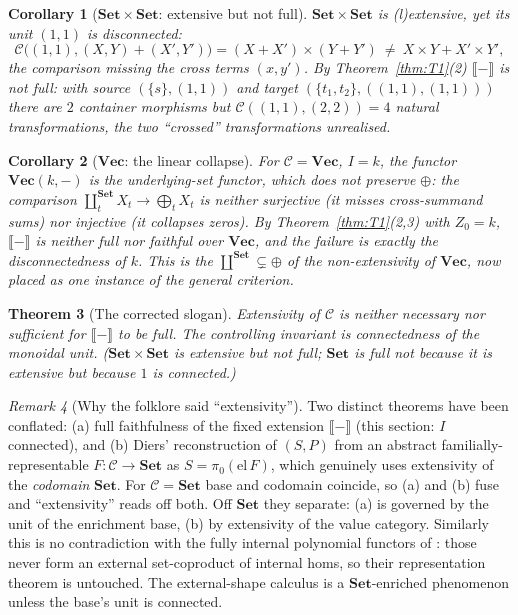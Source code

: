\documentclass[11pt]{amsart}
\theoremstyle{plain}
\newtheorem{theorem}{Theorem}[section]
\newtheorem{corollary}[theorem]{Corollary}
\theoremstyle{definition}
\theoremstyle{remark}
\newtheorem{remark}[theorem]{Remark}
\newcommand{\C}{\mathcal{C}}
\newcommand{\Set}{\mathbf{Set}}
\newcommand{\Vect}{\mathbf{Vec}}
\newcommand{\ext}[1]{\llbracket #1 \rrbracket}
\begin{document}
\begin{corollary}[$\Set\times\Set$: extensive but not full]\label{cor:setset}
$\Set\times\Set$ is (l)extensive, yet its unit $(1,1)$ is disconnected:
\[
\C\bigl((1,1),(X,Y)+(X',Y')\bigr)=(X+X')\times(Y+Y')\ \neq\ X{\times}Y+X'{\times}Y',
\]
the comparison missing the cross terms $(x,y')$. By Theorem~\ref{thm:T1}(2) $\ext{-}$ is not full:
with source $(\{s\},(1,1))$ and target $(\{t_1,t_2\},((1,1),(1,1)))$ there are $2$ container
morphisms but $\C((1,1),(2,2))=4$ natural transformations, the two ``crossed'' transformations
unrealised.
\end{corollary}

\begin{corollary}[$\Vect$: the linear collapse]\label{cor:vec}
For $\C=\Vect$, $I=k$, the functor $\Vect(k,-)$ is the underlying-set functor, which does not
preserve $\oplus$: the comparison $\coprod^{\Set}_t X_t\to\bigoplus_t X_t$ is neither surjective (it
misses cross-summand sums) nor injective (it collapses zeros). By Theorem~\ref{thm:T1}(2,3) with
$Z_0=k$, $\ext{-}$ is neither full nor faithful over $\Vect$, and the failure is exactly the
disconnectedness of $k$. This is the $\coprod^{\Set}\subsetneq\oplus$ of the non-extensivity of
$\Vect$, now placed as one instance of the general criterion.
\end{corollary}

\begin{theorem}[The corrected slogan]\label{thm:slogan}
Extensivity of $\C$ is neither necessary nor sufficient for $\ext{-}$ to be full. The controlling
invariant is connectedness of the monoidal unit. ($\Set\times\Set$ is extensive but not full;
$\Set$ is full not because it is extensive but because $1$ is connected.)
\end{theorem}

\begin{remark}[Why the folklore said ``extensivity'']\label{rem:folklore}
Two distinct theorems have been conflated: (a) full faithfulness of the fixed extension $\ext{-}$
(this section: $I$ connected), and (b) Diers' reconstruction \cite{Diers} of $(S,P)$ from an
abstract familially-representable $F\colon\C\to\Set$ as $S=\pi_0(\mathrm{el}\,F)$, which genuinely
uses extensivity of the \emph{codomain} $\Set$. For $\C=\Set$ base and codomain coincide, so (a) and
(b) fuse and ``extensivity'' reads off both. Off $\Set$ they separate: (a) is governed by the unit of
the enrichment base, (b) by extensivity of the value category. Similarly this is no contradiction
with the fully internal polynomial functors of \cite{GambinoKock}: those never form an external
set-coproduct of internal homs, so their representation theorem is untouched. The external-shape
calculus is a $\Set$-enriched phenomenon unless the base's unit is connected.
\end{remark}
\end{document}
